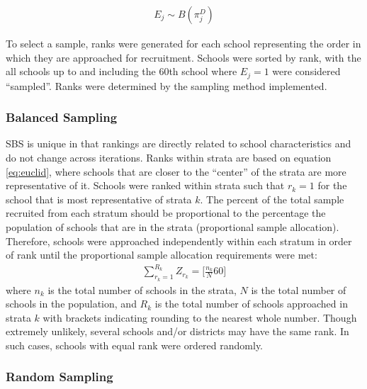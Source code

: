 \documentclass[man,floatsintext]{apa6}
\begin{document}
\begin{align} \label{eq:Ej}
  E_j \sim B(\pi^D_j)
\end{align}

To select a sample, ranks were generated for each school representing the order in which they are approached for recruitment. Schools were sorted by rank, with the all schools up to and including the 60th school where \(E_j = 1\) were considered \enquote{sampled}. Ranks were determined by the sampling method implemented.

\hypertarget{balanced-sampling-1}{%
\subsubsection{Balanced Sampling}\label{balanced-sampling-1}}

SBS is unique in that rankings are directly related to school characteristics and do not change across iterations. Ranks within strata are based on equation \eqref{eq:euclid}, where schools that are closer to the \enquote{center} of the strata are more representative of it. Schools were ranked within strata such that \(r_k= 1\) for the school that is most representative of strata \(k\). The percent of the total sample recruited from each stratum should be proportional to the percentage the population of schools that are in the strata (proportional sample allocation). Therefore, schools were approached independently within each stratum in order of rank until the proportional sample allocation requirements were met:
\begin{align} \label{eq:rankCASS}
  \sum_{r_{k}=1}^{R_k}{Z_{r_k} = [\frac{n_k}{N}60}]
\end{align}
where \(n_k\) is the total number of schools in the strata, \(N\) is the total number of schools in the population, and \(R_k\) is the total number of schools approached in strata \(k\) with brackets indicating rounding to the nearest whole number. Though extremely unlikely, several schools and/or districts may have the same rank. In such cases, schools with equal rank were ordered randomly.

\hypertarget{random-sampling}{%
\subsubsection{Random Sampling}\label{random-sampling}}
\end{document}
